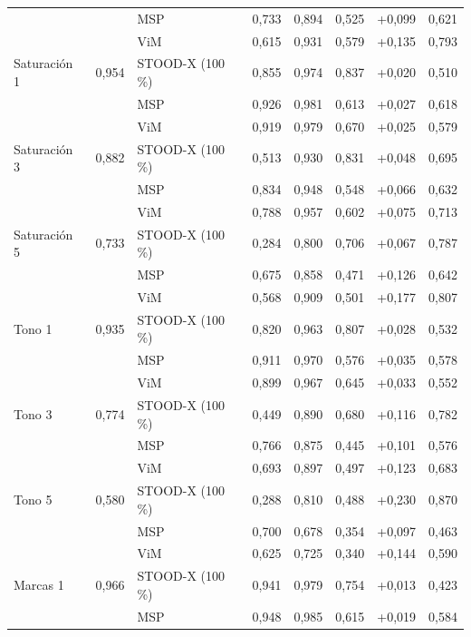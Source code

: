 {\begin{longtable}{lllccccc}
 &  & MSP & 0{,}733 & 0{,}894 & 0{,}525 & +0{,}099 & 0{,}621 \\
 &  & ViM & 0{,}615 & 0{,}931 & 0{,}579 & +0{,}135 & 0{,}793 \\
\addlinespace[2pt]
Saturación 1 & 0{,}954 & STOOD-X (100\,\%) & 0{,}855 & 0{,}974 & 0{,}837 & +0{,}020 & 0{,}510 \\
 &  & MSP & 0{,}926 & 0{,}981 & 0{,}613 & +0{,}027 & 0{,}618 \\
 &  & ViM & 0{,}919 & 0{,}979 & 0{,}670 & +0{,}025 & 0{,}579 \\
\addlinespace[2pt]
Saturación 3 & 0{,}882 & STOOD-X (100\,\%) & 0{,}513 & 0{,}930 & 0{,}831 & +0{,}048 & 0{,}695 \\
 &  & MSP & 0{,}834 & 0{,}948 & 0{,}548 & +0{,}066 & 0{,}632 \\
 &  & ViM & 0{,}788 & 0{,}957 & 0{,}602 & +0{,}075 & 0{,}713 \\
\addlinespace[2pt]
Saturación 5 & 0{,}733 & STOOD-X (100\,\%) & 0{,}284 & 0{,}800 & 0{,}706 & +0{,}067 & 0{,}787 \\
 &  & MSP & 0{,}675 & 0{,}858 & 0{,}471 & +0{,}126 & 0{,}642 \\
 &  & ViM & 0{,}568 & 0{,}909 & 0{,}501 & +0{,}177 & 0{,}807 \\
\addlinespace[2pt]
Tono 1 & 0{,}935 & STOOD-X (100\,\%) & 0{,}820 & 0{,}963 & 0{,}807 & +0{,}028 & 0{,}532 \\
 &  & MSP & 0{,}911 & 0{,}970 & 0{,}576 & +0{,}035 & 0{,}578 \\
 &  & ViM & 0{,}899 & 0{,}967 & 0{,}645 & +0{,}033 & 0{,}552 \\
\addlinespace[2pt]
Tono 3 & 0{,}774 & STOOD-X (100\,\%) & 0{,}449 & 0{,}890 & 0{,}680 & +0{,}116 & 0{,}782 \\
 &  & MSP & 0{,}766 & 0{,}875 & 0{,}445 & +0{,}101 & 0{,}576 \\
 &  & ViM & 0{,}693 & 0{,}897 & 0{,}497 & +0{,}123 & 0{,}683 \\
\addlinespace[2pt]
Tono 5 & 0{,}580 & STOOD-X (100\,\%) & 0{,}288 & 0{,}810 & 0{,}488 & +0{,}230 & 0{,}870 \\
 &  & MSP & 0{,}700 & 0{,}678 & 0{,}354 & +0{,}097 & 0{,}463 \\
 &  & ViM & 0{,}625 & 0{,}725 & 0{,}340 & +0{,}144 & 0{,}590 \\
\addlinespace[2pt]
Marcas 1 & 0{,}966 & STOOD-X (100\,\%) & 0{,}941 & 0{,}979 & 0{,}754 & +0{,}013 & 0{,}423 \\
 &  & MSP & 0{,}948 & 0{,}985 & 0{,}615 & +0{,}019 & 0{,}584 \\

\end{longtable}}
